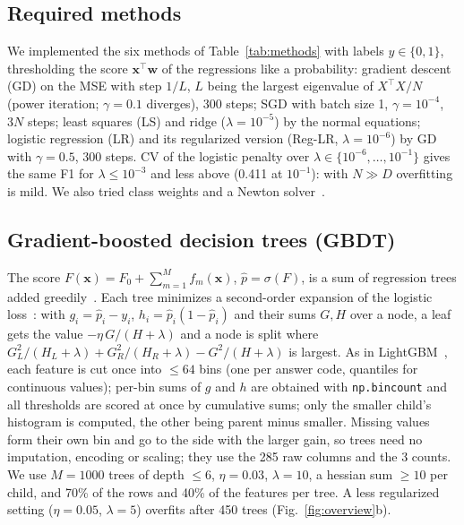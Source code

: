 \documentclass[10pt,conference,compsocconf]{IEEEtran}
\begin{document}
\subsection{Required methods}
We implemented the six methods of Table~\ref{tab:methods} with labels $y\in\{0,1\}$, thresholding the score $\mathbf{x}^\top\mathbf{w}$ of the regressions like a probability:
gradient descent (GD) on the MSE with step $1/L$, $L$ being the largest eigenvalue of $X^\top X/N$ (power iteration; $\gamma=0.1$ diverges), 300 steps;
SGD with batch size 1, $\gamma=10^{-4}$, $3N$ steps; least squares (LS) and ridge ($\lambda=10^{-5}$) by the normal equations; logistic regression (LR) and its regularized version (Reg-LR, $\lambda=10^{-6}$) by GD with $\gamma=0.5$, 300 steps.
CV of the logistic penalty over $\lambda\in\{10^{-6},\dots,10^{-1}\}$ gives the same F1 for $\lambda\le10^{-3}$ and less above (0.411 at $10^{-1}$): with $N\gg D$ overfitting is mild. We also tried class weights and a Newton solver~\cite{esl}.

\subsection{Gradient-boosted decision trees (GBDT)}
\label{sec:gbdt}
The score $F(\mathbf{x})=F_0+\sum_{m=1}^{M}f_m(\mathbf{x})$, $\hat p=\sigma(F)$, is a sum of regression trees added greedily~\cite{friedman2001}.
Each tree minimizes a second-order expansion of the logistic loss~\cite{xgboost}: with $g_i=\hat p_i-y_i$, $h_i=\hat p_i(1-\hat p_i)$ and their sums $G,H$ over a node, a leaf gets the value $-\eta\,G/(H+\lambda)$ and a node is split where $G_L^2/(H_L+\lambda)+G_R^2/(H_R+\lambda)-G^2/(H+\lambda)$ is largest.
As in LightGBM~\cite{lightgbm}, each feature is cut once into $\le64$ bins (one per answer code, quantiles for continuous values); per-bin sums of $g$ and $h$ are obtained with \texttt{np.bincount} and all thresholds are scored at once by cumulative sums; only the smaller child's histogram is computed, the other being parent minus smaller.
Missing values form their own bin and go to the side with the larger gain, so trees need no imputation, encoding or scaling; they use the 285 raw columns and the 3 counts.
We use $M=1000$ trees of depth $\le6$, $\eta=0.03$, $\lambda=10$, a hessian sum $\ge10$ per child, and 70\% of the rows and 40\% of the features per tree.
A less regularized setting ($\eta=0.05$, $\lambda=5$) overfits after 450 trees (Fig.~\ref{fig:overview}b).
\end{document}
